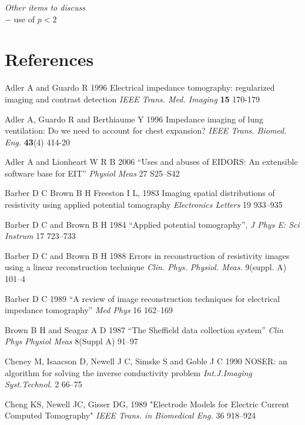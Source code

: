 \documentclass[12pt]{iopart}
\begin{document}
{\em Other items to discuss}
\\
$-$ use of $p<2$



\section*{References}

\References %
\item[]
Adler A and Guardo R 1996 Electrical impedance tomography:
regularized imaging and contrast detection {\em IEEE Trans. Med.
Imaging} {\bf 15} 170-179

\item[]
Adler A, Guardo R and Berthiaume Y 1996 Impedance imaging of lung
ventilation: Do we need to account for chest expansion? {\em IEEE
Trans. Biomed. Eng.} {\bf 43}(4) 414-20


\item[]
Adler A and Lionheart W R B 2006
``Uses and abuses of EIDORS: An extensible software base for EIT''
{\em Physiol Meas}
27 S25--S42

\item[]
Barber D C
Brown B H
Freeston I L, 1983
Imaging spatial distributions of resistivity using applied potential tomography
{\em Electronics Letters}
19 933--935


\item[]
Barber D C and Brown B H 1984
``Applied potential tomography'', 
{\em J Phys E: Sci Instrum}
 17 723--733

\item[]
Barber D C and Brown B H 1988 Errors in reconstruction of
resistivity images using a linear reconstruction technique {\em
Clin. Phys. Physiol. Meas.} 
9(suppl. A) 101--4

\item[]
Barber D C 1989
``A review of image reconstruction techniques for electrical
 impedance tomography''
{\em Med Phys}
16 162--169

\item[]
Brown B H and Seagar A D 1987 
``The Sheffield data collection system''
{\em Clin Phys Physiol Meas}
 8(Suppl A) 91--97

\item[]
Cheney M, Isaacson D, Newell J C, Simske S and Goble J C 1990
NOSER: an algorithm for solving the inverse conductivity problem
{\em Int.J.Imaging Syst.Technol.} 
2 66--75

\item[]
Cheng KS, Newell JC, Gisser DG, 1989
"Electrode Models for Electric Current Computed Tomography"
{\em IEEE Trans. in Biomedical Eng.}
36 918--924
\end{document}
